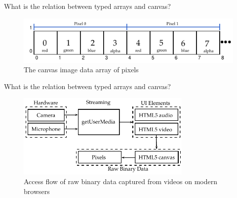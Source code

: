 \documentclass{beamer}
\begin{document}
\begin{frame}{What is the relation between typed arrays and canvas?}
  \begin{figure}[!htb]
    \centering
    \includegraphics[width=\linewidth]{../chapters/basic_concepts/imagedata_array.pdf}
    \caption{The canvas image data array of pixels}
    \label{figure:imagedata_array}
  \end{figure}
\end{frame}
\begin{frame}{What is the relation between typed arrays and canvas?}
  \begin{figure}[!htb]
    \centering
    \includegraphics[width=240pt]{../chapters/basic_concepts/get_user_media.pdf}
    \caption{Access flow of raw binary data captured from videos on modern browsers}
    \label{figure:get_user_media}
  \end{figure}
\end{frame}
\end{document}
